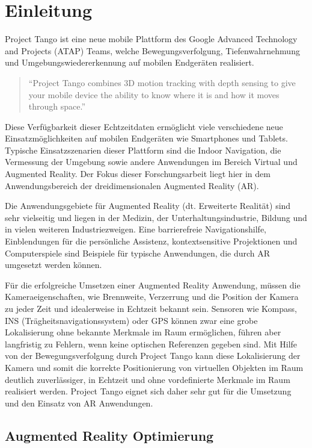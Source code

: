 \chapter{Einleitung}

Project Tango ist eine neue mobile Plattform des Google Advanced Technology and Projects (ATAP) Teams, welche Bewegungsverfolgung, Tiefenwahrnehmung und Umgebungswiedererkennung auf mobilen Endgeräten realisiert.

\begin{quotation}
\enquote{Project Tango combines 3D motion tracking with depth sensing to give your mobile device the ability to know where it is and how it moves through space.}  \citep{Proje19:online}
\end{quotation}

Diese Verfügbarkeit dieser Echtzeitdaten ermöglicht viele verschiedene neue Einsatzmöglichkeiten auf mobilen Endgeräten wie Smartphones und Tablets. Typische Einsatzszenarien dieser Plattform sind die Indoor Navigation, die Vermessung der Umgebung sowie andere Anwendungen im Bereich Virtual und Augmented Reality. Der Fokus dieser Forschungsarbeit liegt hier in dem Anwendungsbereich der dreidimensionalen Augmented Reality (AR). 

Die Anwendungsgebiete für Augmented Reality (dt. Erweiterte Realität) sind sehr vielseitig und liegen in der Medizin, der Unterhaltungsindustrie, Bildung und in vielen weiteren Industriezweigen. Eine barrierefreie Navigationshilfe, Einblendungen für die persönliche Assistenz, kontextsensitive Projektionen und Computerspiele sind Beispiele für typische Anwendungen, die durch AR umgesetzt werden können. 

Für die erfolgreiche Umsetzen einer Augmented Reality Anwendung, müssen die Kameraeigenschaften, wie Brennweite, Verzerrung und die Position der Kamera zu jeder Zeit und idealerweise in Echtzeit bekannt sein. Sensoren wie Kompass, INS (Trägheits\-navigations\-system) oder GPS können zwar eine grobe Lokalisierung ohne bekannte Merkmale im Raum ermöglichen, führen aber langfristig zu Fehlern, wenn keine optischen Referenzen gegeben sind. Mit Hilfe von der Bewegungsverfolgung durch Project Tango kann diese Lokalisierung der Kamera und somit die korrekte Positionierung von virtuellen Objekten im Raum deutlich zuverlässiger, in Echtzeit und ohne vordefinierte Merkmale im Raum realisiert werden. Project Tango eignet sich daher sehr gut für die Umsetzung und den Einsatz von AR Anwendungen.

\section{Augmented Reality Optimierung}

